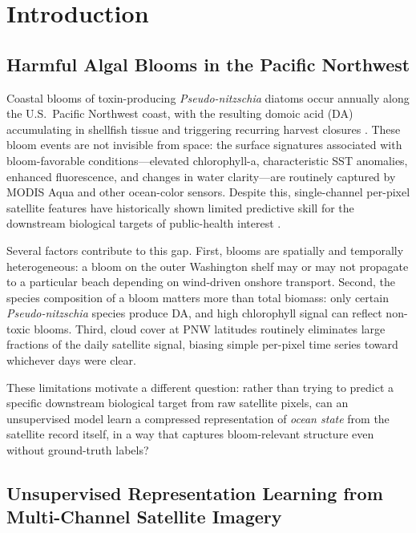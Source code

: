 \documentclass[toxins,article,submit,moreauthors]{Definitions/mdpi}
\begin{document}
\section{Introduction}
\label{sec:intro}

\subsection{Harmful Algal Blooms in the Pacific Northwest}

Coastal blooms of toxin-producing \textit{Pseudo-nitzschia} diatoms occur annually along the U.S.\ Pacific Northwest coast, with the resulting domoic acid (DA) accumulating in shellfish tissue and triggering recurring harvest closures \cite{Trainer2009, McCabe2023}. These bloom events are not invisible from space: the surface signatures associated with bloom-favorable conditions---elevated chlorophyll-a, characteristic SST anomalies, enhanced fluorescence, and changes in water clarity---are routinely captured by MODIS Aqua and other ocean-color sensors. Despite this, single-channel per-pixel satellite features have historically shown limited predictive skill for the downstream biological targets of public-health interest \cite{Anderson2016, Hill2020}.

Several factors contribute to this gap. First, blooms are spatially and temporally heterogeneous: a bloom on the outer Washington shelf may or may not propagate to a particular beach depending on wind-driven onshore transport. Second, the species composition of a bloom matters more than total biomass: only certain \textit{Pseudo-nitzschia} species produce DA, and high chlorophyll signal can reflect non-toxic blooms. Third, cloud cover at PNW latitudes routinely eliminates large fractions of the daily satellite signal, biasing simple per-pixel time series toward whichever days were clear.

These limitations motivate a different question: rather than trying to predict a specific downstream biological target from raw satellite pixels, can an unsupervised model learn a compressed representation of \emph{ocean state} from the satellite record itself, in a way that captures bloom-relevant structure even without ground-truth labels?

\subsection{Unsupervised Representation Learning from Multi-Channel Satellite Imagery}
\end{document}
